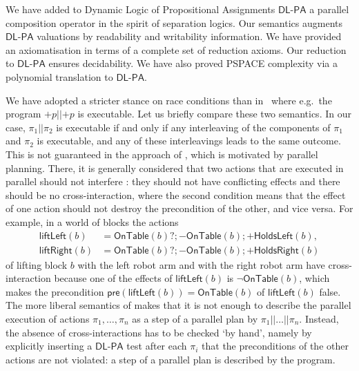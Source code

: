 \documentclass{llncs}
\newcommand{\pll}{ {||} }							%
\newcommand{\Dlpa}{\ensuremath{\mathsf{DL\text{-}PA}}\xspace}
\newcommand{\jb}[1]{\**\marginpar{\textbf{JB:} #1}}
\newcommand{\assgntop}[1]{{\mathtt {+} #1}}
\newcommand{\assgnbot}[1]{{\mathtt {-} #1}}
\begin{document}
We have added to Dynamic Logic of Propositional Assignments \Dlpa
a parallel composition operator in the spirit of separation logics. 
Our semantics augments \Dlpa valuations by readability and writability information. 
We have provided an axiomatisation in terms of a complete set of reduction axioms. 
Our reduction to \Dlpa ensures decidability. 
We have also proved PSPACE complexity via a polynomial translation to \Dlpa. 

We have adopted a stricter stance on race conditions than in~\cite{HerzigEtal-Ijcai19} %
where e.g.~the program $\assgntop p \pll \assgntop p$ is executable. 
Let us briefly compare these two semantics. 
In our case, $\pi_1 \pll \pi_2$ is executable if and only if any interleaving of the components of $\pi_1$ and $\pi_2$ is executable, and any of these interleavings leads to the same outcome. 
This is not guaranteed in the approach of \cite{HerzigEtal-Ijcai19}, which is motivated by parallel planning. 
There, it is generally considered that two actions that are executed in parallel should not interfere \cite{DBLP:journals/ai/BlumF97}:
they should not have conflicting effects and there should be no cross-interaction, where the second condition means that the effect of one action should not destroy the precondition of the other, and vice versa. 
For example, in a world of blocks the actions 
\begin{align*}
\mathsf{liftLeft}(b) &= \mathsf{OnTable}(b) ? ; \assgnbot{ \mathsf{OnTable}(b) } ; \assgntop{ \mathsf{HoldsLeft}(b) }  ,
\\
\mathsf{liftRight}(b) &= \mathsf{OnTable}(b) ? ; \assgnbot{ \mathsf{OnTable}(b) }  ; \assgntop{ \mathsf{HoldsRight}(b) } 
\end{align*}
of lifting block $b$ with the left robot arm and with the right robot arm have cross-interaction because 
one of the effects of $\mathsf{liftLeft}(b)$ is $\lnot \mathsf{OnTable}(b)$, which makes the precondition $\mathsf{pre}(\mathsf{liftLeft}(b)) = \mathsf{OnTable}(b)$ of $\mathsf{liftLeft}(b)$ false.
The more liberal semantics of \cite{HerzigEtal-Ijcai19} makes that it is not enough to describe the parallel execution of actions $\pi_1,\ldots,\pi_n$ as a step of a parallel plan by $\pi_1 \pll \ldots \pll \pi_n$. 
Instead, the absence of cross-interactions has to be checked `by hand', namely by explicitly inserting a \Dlpa test after each $\pi_i$ that the preconditions of the other actions are not violated: a step of a parallel plan is described by the program.
\end{document}
